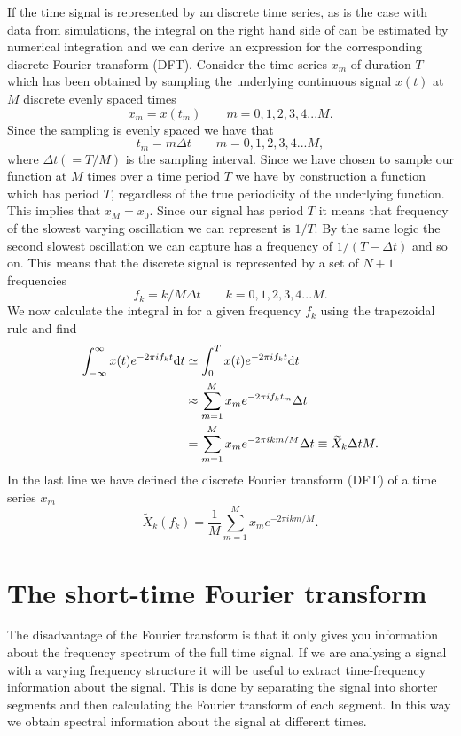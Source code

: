 If the time signal is represented by an discrete time series, as is the case with data from simulations,
the integral on the right hand side of  can be estimated by numerical integration and 
we can derive an expression for the corresponding discrete Fourier transform (DFT).
Consider the time series $x_m$ of duration $T$ which has been obtained by sampling the underlying 
continuous signal $x(t)$ at $M$ discrete evenly spaced times
\begin{equation}
x_m = x(t_m) \qquad m = 0,1,2,3,4 ... M.
\end{equation} 
Since the sampling is evenly spaced we have that 
\begin{equation}
t_m = m\Delta t \qquad m = 0,1,2,3,4 ... M,
\end{equation} 
where $\Delta t( = T/M)$ is the sampling interval.
Since we have chosen to sample our function at $M$ times over a time period
$T$ we have by construction a function which has period $T$, regardless of the true periodicity of the
underlying function. This implies that $x_M = x_0$. Since our signal has period $T$ it means that frequency
of the slowest varying oscillation we can represent is $1/T$. By the same logic the second slowest oscillation 
we can capture has a frequency of $1/(T-\Delta t)$ and so on. This means that the discrete signal
is represented by a set of $N+1$ frequencies 
\begin{equation}
f_k = k/M \Delta t \qquad k = 0,1,2,3,4 ... M.
\end{equation}
We now calculate the integral in  for a given frequency $f_k$ using the trapezoidal rule and find
\begin{align} 
\int_{-\infty}^{\infty} x(t) e^{-2 \pi i f_k t} \mathrm{d} t &\simeq \int_{0}^{T} x(t) e^{-2 \pi i f_k t} \mathrm{d} t \nonumber \\
&\approx \sum_{m=1}^{M} x_m e^{-2 \pi i f_k t_m} \Delta t \nonumber \\
& = \sum_{m=1}^{M} x_m e^{-2 \pi i k m/M} \Delta t \equiv \widetilde{X}_k \Delta t M. \label{eqSA:dft1}
\end{align}
In the last line we have defined the discrete Fourier transform (DFT) of a time series $x_m$
\begin{equation} \label{eqSA:DFT}
\widetilde{X}_k (f_k) = \frac{1}{M}  \sum^M_{m=1} x_m e^{-2\pi i k m/M}.
\end{equation}

\section{The short-time Fourier transform}
The disadvantage of the Fourier transform is that it only gives you information
about the frequency spectrum of the full time signal. If we are analysing a 
signal with a varying frequency structure it will be useful to extract 
time-frequency information about the signal. This is done by separating
the signal into shorter segments and then calculating the Fourier transform of each
segment. In this way we obtain spectral information about the
signal at different times.

